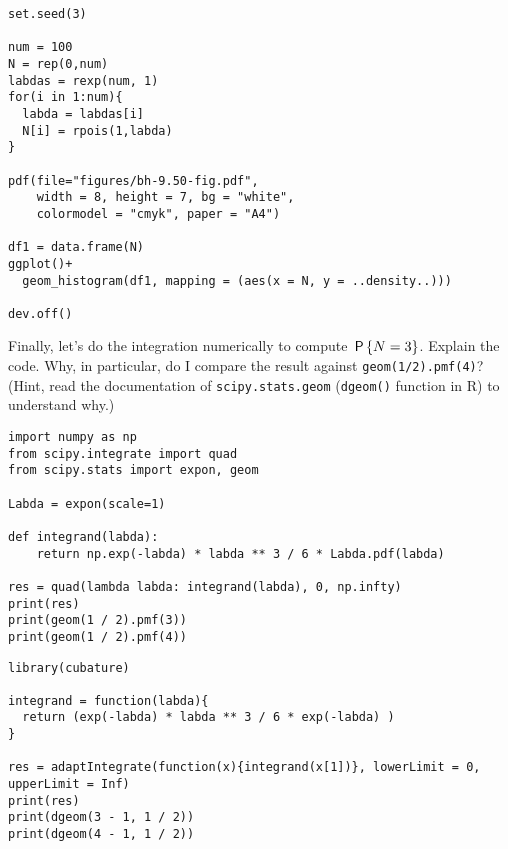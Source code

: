 \begin{verbatim}
set.seed(3)

num = 100
N = rep(0,num)
labdas = rexp(num, 1)
for(i in 1:num){
  labda = labdas[i]
  N[i] = rpois(1,labda)
}

pdf(file="figures/bh-9.50-fig.pdf",
    width = 8, height = 7, bg = "white",
    colormodel = "cmyk", paper = "A4")

df1 = data.frame(N)
ggplot()+
  geom_histogram(df1, mapping = (aes(x = N, y = ..density..)))

dev.off()
\end{verbatim}

\begin{exercise}
Finally, let's do the integration numerically to compute $\P{N=3}$. Explain the code. Why, in particular, do I compare the result against \texttt{geom(1/2).pmf(4)}? (Hint, read the documentation of \texttt{scipy.stats.geom} (\texttt{dgeom()} function in R) to understand why.)
\begin{verbatim}
import numpy as np
from scipy.integrate import quad
from scipy.stats import expon, geom

Labda = expon(scale=1)

def integrand(labda):
    return np.exp(-labda) * labda ** 3 / 6 * Labda.pdf(labda)

res = quad(lambda labda: integrand(labda), 0, np.infty)
print(res)
print(geom(1 / 2).pmf(3))
print(geom(1 / 2).pmf(4))
\end{verbatim}

\begin{verbatim}
library(cubature)

integrand = function(labda){
  return (exp(-labda) * labda ** 3 / 6 * exp(-labda) )
}

res = adaptIntegrate(function(x){integrand(x[1])}, lowerLimit = 0, upperLimit = Inf)
print(res)
print(dgeom(3 - 1, 1 / 2))
print(dgeom(4 - 1, 1 / 2))
\end{verbatim}

\end{exercise}






